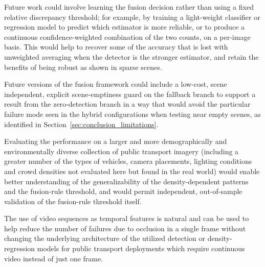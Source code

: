 
Future work could involve learning the fusion decision rather than using a fixed relative discrepancy threshold; for example, by training a light-weight classifier or regression model to predict which estimator is more reliable, or to produce a continuous confidence-weighted combination of the two counts, on a per-image basis. This would help to recover some of the accuracy that is lost with unweighted averaging when the detector is the stronger estimator, and retain the benefits of being robust as shown in sparse scenes.

Future versions of the fusion framework could include a low-cost, scene independent, explicit scene-emptiness guard on the fallback branch to support a result from the zero-detection branch in a way that would avoid the particular failure mode seen in the hybrid configurations when testing near empty scenes, as identified in Section~\ref{sec:conclusion_limitations}.

Evaluating the performance on a larger and more demographically and environmentally diverse collection of public transport imagery (including a greater number of the types of vehicles, camera placements, lighting conditions and crowd densities not evaluated here but found in the real world) would enable better understanding of the generalizability of the density-dependent patterns and the fusion-rule threshold, and would permit independent, out-of-sample validation of the fusion-rule threshold itself.

The use of video sequences as temporal features is natural and can be used to help reduce the number of failures due to occlusion in a single frame without changing the underlying architecture of the utilized detection or density-regression models for public transport deployments which require continuous video instead of just one frame.

